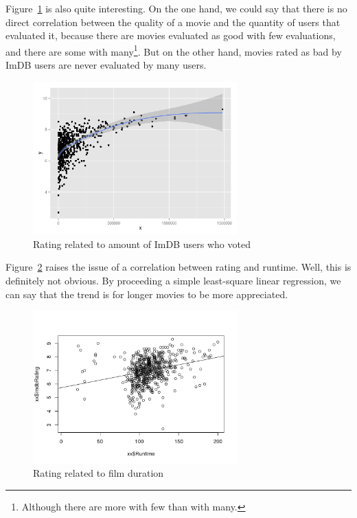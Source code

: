 Figure~\ref{fig:ratingPerNbVotes} is also quite interesting.
On the one hand, we could say that there is no direct correlation between the quality of a movie and the quantity of users that evaluated it,
because there are movies evaluated as good with few evaluations, and there are some with many\footnote{Although there are more with few than with many.}.
But on the other hand, movies rated as bad by ImDB users are never evaluated by many users.

\begin{figure}[!h]
\begin{center}
\includegraphics[width=0.70\textwidth]{../src/pre-processing/stats/results/ratingPerNbVotes.png}
\end{center}
\caption{Rating related to amount of ImDB users who voted}
\label{fig:ratingPerNbVotes}
\end{figure}

\newpage
Figure~\ref{fig:ratingPerRuntime} raises the issue of a correlation between rating and runtime.
Well, this is definitely not obvious.
By proceeding a simple least-square linear regression, we can say that the trend is for longer movies to be more appreciated.

\begin{figure}[!h]
\begin{center}
\includegraphics[width=0.70\textwidth]{../src/pre-processing/stats/results/ratingPerRuntime.png}
\end{center}
\caption{Rating related to film duration}
\label{fig:ratingPerRuntime}
\end{figure}

